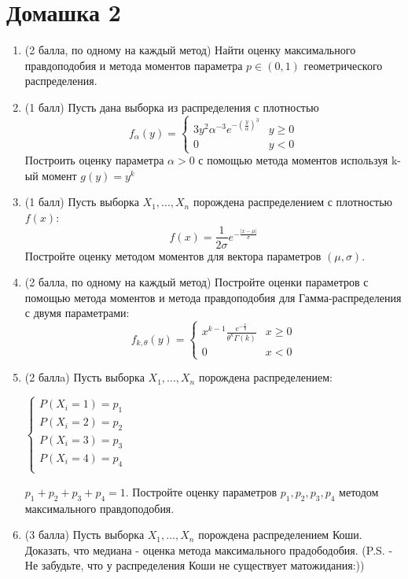 \documentclass[a4paper, 14pt]{extarticle}
\begin{document}
\section{Домашка 2}
\begin{enumerate}
	\item (2 балла, по одному на каждый метод)
	Найти оценку максимального правдоподобия и метода моментов 
	параметра $p \in (0, 1)$ геометрического распределения.
	\item (1 балл) Пусть дана выборка из распределения с плотностью
	$$f_{\alpha}(y) = 
	\begin{cases}
		3y^2\alpha^{-3}e^{-(\frac{y}{\alpha})^3} & y\geq 0\\
		0 & y < 0
	\end{cases}$$
	Построить оценку параметра $\alpha > 0$ с помощью метода моментов используя k-ый момент $g(y) = y^k$
	\item (1 балл) Пусть выборка $X_1, ..., X_n$ порождена распределением с плотностью $f(x)$: $$ f(x) = \frac{1}{2\sigma} e^{-\frac{\left|x - \mu\right|}{\sigma}}$$
	Постройте оценку методом моментов для вектора параметров $\left(\mu, \sigma\right)$.
	\item (2 балла, по одному на каждый метод) 
	Постройте оценки параметров с помощью метода моментов и метода правдоподобия для 
	Гамма-распределения с двумя параметрами:
	$$f_{k, \theta}(y) = 
	\begin{cases}
		x^{k-1}\frac{e^{-\frac{x}{\theta}}}{\theta^k\Gamma(k)} & x\geq 0\\
		0 & x < 0
	\end{cases}$$
	\item (2 баллa) Пусть выборка $X_1, ..., X_n$ порождена распределением:
	\begin{center}
		$\begin{cases}
			P(X_i = 1) = p_1\\
			P(X_i = 2) = p_2\\
			P(X_i = 3) = p_3\\
			P(X_i = 4) = p_4\\
		\end{cases}$
	\end{center}
	$p_1 + p_2 + p_3 + p_4 = 1$. Постройте оценку параметров $p_1, p_2, p_3, p_4$ методом максимального правдоподобия.
	\item (3 балла) Пусть выборка $X_1, ..., X_n$ порождена распределением Коши. Доказать, что медиана - оценка метода максимального прадободобия. 
	(P.S. - Не забудьте, что у распределения Коши не существует матожидания:))
		
	
\end{enumerate}
\end{document}
